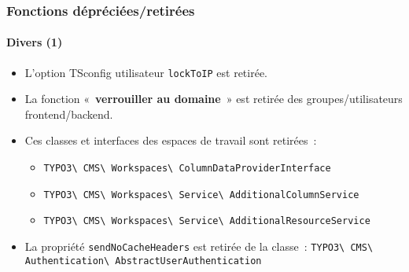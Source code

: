 %

\begin{frame}[fragile]
	\frametitle{Fonctions dépréciées/retirées}
	\framesubtitle{Divers (1)}

	\begin{itemize}
		\item L'option TSconfig utilisateur \texttt{lockToIP} est retirée.
		\item La fonction «~\textbf{verrouiller au domaine}~» est retirée des groupes/utilisateurs
			frontend/backend.
		\item Ces classes et interfaces des espaces de travail sont retirées~:
			\begin{itemize}\smaller
				\item \texttt{TYPO3\textbackslash
					CMS\textbackslash
					Workspaces\textbackslash
					ColumnDataProviderInterface}
				\item \texttt{TYPO3\textbackslash
					CMS\textbackslash
					Workspaces\textbackslash
					Service\textbackslash
					AdditionalColumnService}
				\item \texttt{TYPO3\textbackslash
					CMS\textbackslash
					Workspaces\textbackslash
					Service\textbackslash
					AdditionalResourceService}
			\end{itemize}\normalsize

		\item La propriété \texttt{sendNoCacheHeaders} est retirée de la classe~:\newline
			\smaller\texttt{TYPO3\textbackslash
				CMS\textbackslash
				Authentication\textbackslash
				AbstractUserAuthentication}\normalsize
	\end{itemize}

\end{frame}

